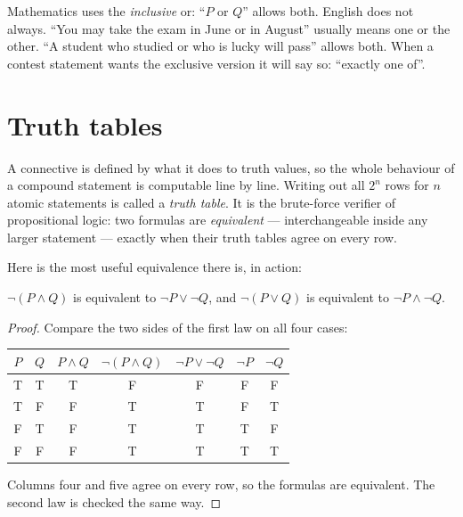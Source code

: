 \begin{remark}
Mathematics uses the \emph{inclusive} or: ``$P$ or $Q$'' allows both. English does
not always. ``You may take the exam in June or in August'' usually means one or the
other. ``A student who studied or who is lucky will pass'' allows both. When a
contest statement wants the exclusive version it will say so: ``exactly one of''.
\end{remark}

\section{Truth tables}\label{sec:truthtables}

A connective is defined by what it does to truth values, so the whole behaviour of a
compound statement is computable line by line. Writing out all $2^n$ rows for $n$
atomic statements is called a \emph{truth table}. It is the brute-force verifier of
propositional logic: two formulas are \emph{equivalent}
--- interchangeable inside any larger statement --- exactly when their truth tables
agree on every row.

Here is the most useful equivalence there is, in action:

\begin{proposition}\label{prop:demorgan}
$\lnot(P\land Q)$ is equivalent to $\lnot P \lor \lnot Q$, and
$\lnot(P\lor Q)$ is equivalent to $\lnot P \land \lnot Q$.
\end{proposition}

\begin{proof}
Compare the two sides of the first law on all four cases:
\begin{center}
\begin{tabular}{cc|cc|c|cc}
\toprule
$P$ & $Q$ & $P\land Q$ & $\lnot(P\land Q)$ & $\lnot P\lor\lnot Q$ & $\lnot P$ & $\lnot Q$\\
\midrule
T&T&T&F&F&F&F\\
T&F&F&T&T&F&T\\
F&T&F&T&T&T&F\\
F&F&F&T&T&T&T\\
\bottomrule
\end{tabular}
\end{center}
Columns four and five agree on every row, so the formulas are equivalent. The second
law is checked the same way.
\end{proof}

